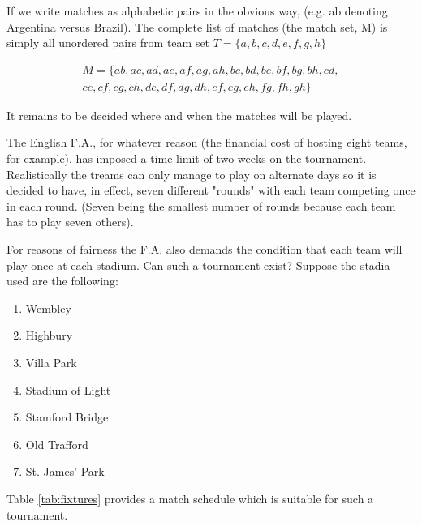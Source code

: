 \documentclass[
  11pt,
  a4paper]{book}\usepackage[]{graphicx}\usepackage[]{xcolor}
\newcounter{example}
\begin{document}
If we write matches as alphabetic pairs in the obvious way, (e.g. ab denoting Argentina versus Brazil).
The complete list of matches (the match set, M) is simply all unordered pairs from team set $T = \{a, b, c, d, e, f, g, h\}$

\begin{equation*}
  \begin{split}
    M = \{
      ab, ac, ad, ae, af, ag, ah, bc, bd, be, bf, bg, bh, cd, \\
      ce, cf, cg, ch, de, df, dg, dh, ef, eg, eh, fg, fh, gh
    \}
  \end{split}
\end{equation*}

It remains to be decided where and when the matches will be played.

The English F.A., for whatever reason (the financial cost of hosting eight teams, for example), has imposed a time limit of two weeks on the tournament.
Realistically the treams can only manage to play on alternate days so it is decided to have, in effect, seven different "rounds" with each team competing once in each round.
(Seven being the smallest number of rounds because each team has to play seven others).

For reasons of fairness the F.A. also demands the condition that each team will play once at each stadium.
Can such a tournament exist?
Suppose the stadia used are the following:

\begin{enumerate}
  \item{Wembley}
  \item{Highbury}
  \item{Villa Park}
  \item{Stadium of Light}
  \item{Stamford Bridge}
  \item{Old Trafford}
  \item{St. James' Park}
\end{enumerate}

Table \ref{tab:fixtures} provides a match schedule which is suitable for such a tournament.
\end{document}
